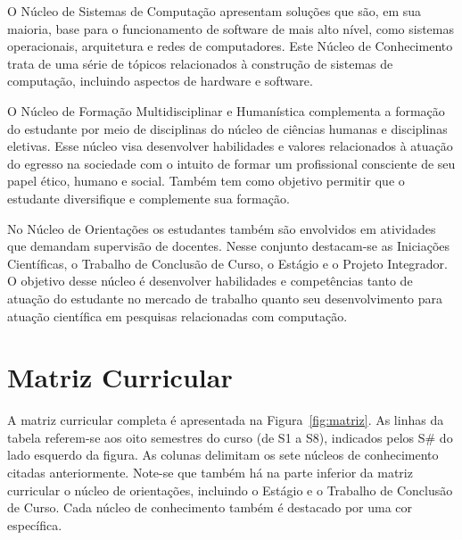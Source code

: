O Núcleo de Sistemas de Computação apresentam soluções que são, em sua maioria, base para o funcionamento de software de mais alto nível, como sistemas operacionais, arquitetura e redes de computadores. Este Núcleo de Conhecimento trata de uma série de tópicos relacionados à construção de sistemas de computação, incluindo aspectos de hardware e software. 

O Núcleo de Formação Multidisciplinar e Humanística complementa a formação do estudante por meio de disciplinas do núcleo de ciências humanas e disciplinas eletivas. Esse núcleo visa desenvolver habilidades e valores relacionados à atuação do egresso na sociedade com o intuito de formar um profissional consciente de seu papel ético, humano e social. Também tem como objetivo permitir que o estudante diversifique e complemente sua formação. 

No Núcleo de Orientações os estudantes também são envolvidos em atividades que demandam supervisão de docentes. Nesse conjunto destacam-se as Iniciações Científicas, o Trabalho de Conclusão de Curso, o Estágio e o Projeto Integrador. O objetivo desse núcleo é desenvolver habilidades e competências tanto de atuação do estudante no mercado de trabalho quanto seu desenvolvimento para atuação científica em pesquisas relacionadas com computação. 







\section{Matriz Curricular}

A matriz curricular completa é apresentada na Figura~\ref{fig:matriz}. As linhas da tabela referem-se aos oito semestres do curso (de S1 a S8), indicados pelos S\# do lado esquerdo da figura. As colunas delimitam os sete núcleos de conhecimento citadas anteriormente. Note-se que também há na parte inferior da matriz curricular o núcleo de orientações, incluindo o Estágio e o Trabalho de Conclusão de Curso. Cada núcleo de conhecimento também é destacado por uma cor específica. 


